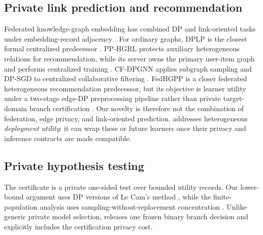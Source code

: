 \subsection{Private link prediction and recommendation}

Federated knowledge-graph embedding has combined DP and link-oriented tasks
under embedding-record adjacency \cite{peng2021fkge}. For ordinary graphs,
DPLP is the closest formal centralized predecessor
\cite{ran2024dplp}. PP-HGRL protects auxiliary heterogeneous relations for
recommendation, while its server owns the primary user-item graph and performs
centralized training \cite{wang2026pphgrl}. CF-DPGNN applies subgraph
sampling and DP-SGD to centralized collaborative filtering
\cite{hu2025cfdpgnn}. FedHGPP is a closer federated heterogeneous
recommendation predecessor, but its objective is learner utility under a
two-stage edge-DP preprocessing pipeline rather than private target-domain
branch certification \cite{li2026fedhgpp}. Our novelty is therefore not the
combination of federation, edge privacy, and link-oriented prediction.
\method{} addresses heterogeneous \emph{deployment utility}: it can wrap
these or future learners once their privacy and inference contracts are made
compatible.

\subsection{Private hypothesis testing}

The certificate is a private one-sided test over bounded utility records.
Our lower-bound argument uses DP versions of Le Cam's method
\cite{acharya2021private}, while the finite-population analysis uses
sampling-without-replacement concentration
\cite{serfling1974probability}. Unlike generic private model selection,
\method{} releases one frozen binary branch decision and explicitly includes
the certification privacy cost.

